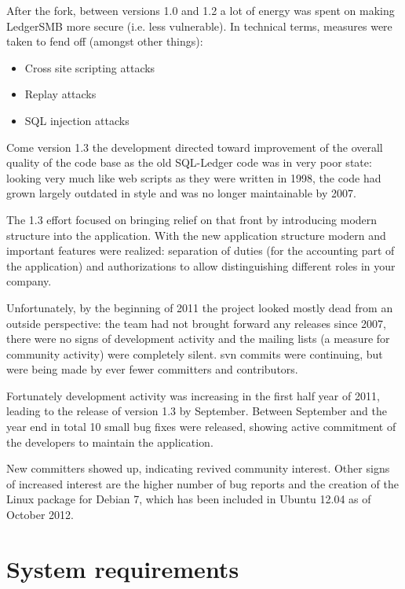 After the fork, between versions 1.0 and 1.2 a lot of energy was spent on
making LedgerSMB more secure (i.e. less vulnerable).  In technical terms,
measures were taken to fend off (amongst other things):

\begin{itemize}
\item Cross site scripting attacks
\item Replay attacks
\item SQL injection attacks
\end{itemize}

Come version 1.3 the development directed toward improvement of the overall
quality of the code base as the old SQL-Ledger code was in very poor state:
looking very much like web scripts as they were written in 1998, the code had
grown largely outdated in style and was no longer maintainable by 2007.

The 1.3 effort focused on bringing relief on that front by introducing
modern structure into the application.  With the new application structure
modern and important features were realized: separation of duties (for the
accounting part of the application) and authorizations to allow distinguishing
different roles in your company.

Unfortunately, by the beginning of 2011 the project looked mostly dead from
an outside perspective: the team had not brought forward any releases since
2007, there were no signs of development activity and the
mailing lists (a measure for community activity) were
completely silent.  \gls{svn} commits were continuing, but were being made by ever
fewer committers and contributors.

Fortunately development activity was increasing in the first half
year of 2011,
leading to the release of version 1.3 by September.  Between September and the
year end in total 10 small bug fixes were released, showing active commitment
of the developers to maintain the application.

New committers showed up, indicating revived community interest. Other signs of
increased interest are the higher number of bug reports and the creation of the
Linux package for Debian 7, which has been included in Ubuntu 12.04 as of
October 2012.



\section{System requirements}
\label{sec-ledgersmb-system-requirements}

